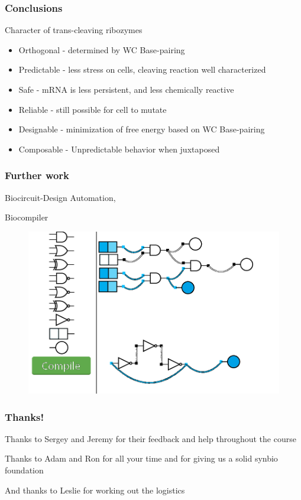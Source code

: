\documentclass{beamer}
\begin{document}
\begin{frame}
\frametitle{Conclusions}

\begin{block}{Character of trans-cleaving ribozymes}
  \begin{itemize}
    \item Orthogonal  - determined by WC Base-pairing
    \item Predictable - less stress on cells, cleaving reaction well characterized
    \item Safe        - mRNA is less persistent, and less chemically reactive 
    \item Reliable    - still possible for cell to mutate
    \item Designable  - minimization of free energy based on WC Base-pairing
    \item Composable  - Unpredictable behavior when juxtaposed
  \end{itemize}
\end{block}

\end{frame}

\begin{frame}
\frametitle{Further work}
Biocircuit-Design Automation,

Biocompiler

\begin{figure}
  \centering
  \includegraphics[scale=0.2]{repress_4and.png}
\end{figure}

\end{frame}


\begin{frame}
\frametitle{Thanks!}

Thanks to Sergey and Jeremy for their feedback and help throughout the course

Thanks to Adam and Ron for all your time and for giving us a solid synbio foundation

And thanks to Leslie for working out the logistics
\end{frame}
\end{document}
